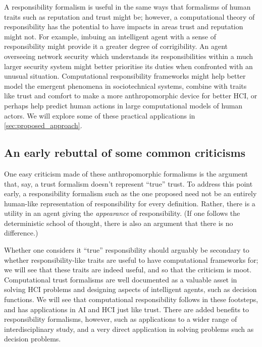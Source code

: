 A responsibility formalism is useful in the same ways that formalisms of human traits such as reputation and trust might be; however, a computational theory of responsibility has the potential to have impacts in areas trust and reputation might not. For example, imbuing an intelligent agent with a sense of responsibility might provide it a greater degree of corrigibility\cite{corrigibility}. An agent overseeing network security which understands its responsibilities within a much larger security system might better prioritise its duties when confronted with an unusual situation. Computational responsibility frameworks might help better model the emergent phenomena in sociotechnical systems, combine with traits like trust and comfort to make a more anthropomorphic device for better HCI, or perhaps help predict human actions in large computational models of human actors. We will explore some of these practical applications in \cref{sec:proposed_approach}.\par

\subsection{An early rebuttal of some common criticisms}
One easy criticism made of these anthropomorphic formalisms is the argument that, say, a trust formalism doesn't represent ``true'' trust. To address this point early, a responsibility formalism such as the one proposed need not be an entirely human-like representation of responsibility for every definition. Rather, there is a utility in an agent giving the \emph{appearance} of responsibility. (If one follows the deterministic school of thought, there is also an argument that there is no difference\cite{determinism_in_brief}.) \par

Whether one considers it ``true'' responsibility should arguably be secondary to whether responsibility-like traits are useful to have computational frameworks for; we will see that these traits are indeed useful, and so that the criticism is moot. Computational trust formalisms are well documented as a valuable asset in solving HCI problems and designing aspects of intelligent agents, such as decision functions. We will see that computational responsibility follows in these footsteps, and has applications in AI and HCI just like trust. There are added benefits to responsibility formalisms, however, such as applications to a wider range of interdisciplinary study, and a very direct application in solving problems such as decision problems.\par

